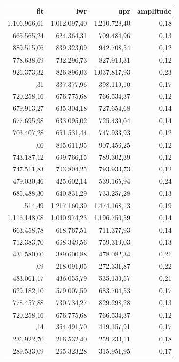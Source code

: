 \documentclass[a4paper]{article}
\begin{document}
\begin{table}
\centering
\begin{tabular}[t]{rrrr}
\toprule
fit & lwr & upr & amplitude\\
\midrule
1.106.966,61 & 1.012.097,40 & 1.210.728,40 & 0,18\\
665.565,24 & 624.364,31 & 709.484,96 & 0,13\\
889.515,06 & 839.323,09 & 942.708,54 & 0,12\\
778.638,69 & 732.296,73 & 827.913,31 & 0,12\\
926.373,32 & 826.896,03 & 1.037.817,93 & 0,23\\
\addlinespace
366.492,31 & 337.377,96 & 398.119,10 & 0,17\\
720.258,16 & 676.775,68 & 766.534,37 & 0,12\\
679.913,27 & 635.304,18 & 727.654,68 & 0,14\\
677.695,98 & 633.095,02 & 725.439,04 & 0,14\\
703.407,28 & 661.531,44 & 747.933,93 & 0,12\\
\addlinespace
855.019,06 & 805.611,95 & 907.456,25 & 0,12\\
743.187,12 & 699.766,15 & 789.302,39 & 0,12\\
747.511,83 & 703.804,25 & 793.933,73 & 0,12\\
479.030,46 & 425.602,14 & 539.165,94 & 0,24\\
685.488,30 & 640.831,29 & 733.257,28 & 0,13\\
\addlinespace
1.339.514,49 & 1.217.160,39 & 1.474.168,13 & 0,19\\
1.116.148,08 & 1.040.974,23 & 1.196.750,59 & 0,14\\
663.458,78 & 618.767,51 & 711.377,93 & 0,14\\
712.383,70 & 668.349,56 & 759.319,03 & 0,13\\
431.580,00 & 389.600,88 & 478.082,34 & 0,21\\
\addlinespace
243.707,09 & 218.091,05 & 272.331,87 & 0,22\\
483.061,17 & 436.055,79 & 535.133,57 & 0,21\\
629.182,10 & 579.007,59 & 683.704,53 & 0,17\\
778.457,88 & 730.734,27 & 829.298,28 & 0,13\\
720.258,16 & 676.775,68 & 766.534,37 & 0,12\\
\addlinespace
385.471,14 & 354.491,70 & 419.157,91 & 0,17\\
236.922,70 & 216.532,40 & 259.233,11 & 0,18\\
289.533,09 & 265.323,28 & 315.951,95 & 0,17\\

\end{tabular}
\end{table}
\end{document}
